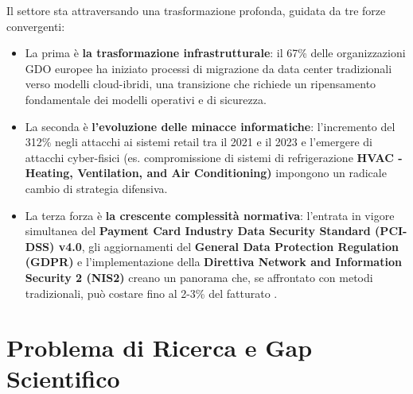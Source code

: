 Il settore sta attraversando una trasformazione profonda, guidata da tre forze convergenti: 
\begin{itemize}
	\item La prima è \textbf{la trasformazione infrastrutturale}: il 67\% delle organizzazioni GDO europee ha iniziato processi di migrazione da data center tradizionali verso modelli cloud-ibridi\autocite{gartner2024cloud}, una transizione che richiede un ripensamento fondamentale dei modelli operativi e di sicurezza.
	\item La seconda è \textbf{l'evoluzione delle minacce informatiche}: l'incremento del 312\% negli attacchi ai sistemi retail tra il 2021 e il 2023\autocite{enisa2024retail} e l'emergere di attacchi cyber-fisici (es. compromissione di sistemi di refrigerazione \textbf{HVAC - Heating, Ventilation, and Air Conditioning)} impongono un radicale cambio di strategia difensiva. 
	\item La terza forza è \textbf{la crescente complessità normativa}: l'entrata in vigore simultanea del \textbf{Payment Card Industry Data Security Standard (PCI-DSS) v4.0}, gli aggiornamenti del \textbf{General Data Protection Regulation (GDPR)} e l'implementazione della \textbf{Direttiva Network and Information Security 2 (NIS2)} creano un panorama che, se affrontato con metodi tradizionali, può costare fino al 2-3\% del fatturato \autocite{ponemon2024compliance}.
\end{itemize}

\section{Problema di Ricerca e Gap Scientifico}

